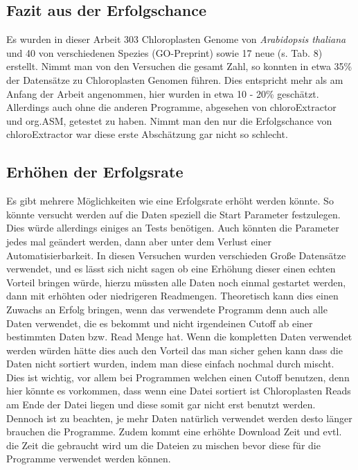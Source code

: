 \documentclass{scrartcl}
\begin{document}
\subsection{Fazit aus der Erfolgschance}
\label{sec-5-3}
Es wurden in dieser Arbeit 303 Chloroplasten Genome von \emph{Arabidopsis thaliana} und 40 von verschiedenen Spezies (GO-Preprint) sowie 17 neue (s. Tab. 8) erstellt. Nimmt man von den Versuchen die gesamt Zahl, so konnten in etwa 35\% der Datensätze zu Chloroplasten Genomen führen.
Dies entspricht mehr als am Anfang der Arbeit angenommen, hier wurden in etwa 10 - 20\% geschätzt\footnotemark[45]{}. Allerdings auch ohne die anderen Programme, abgesehen von chloroExtractor und org.ASM, getestet zu haben. Nimmt man 
den nur die Erfolgschance von chloroExtractor war diese erste Abschätzung gar nicht so schlecht.   
\subsection{Erhöhen der Erfolgsrate}
\label{sec-5-4}
Es gibt mehrere Möglichkeiten wie eine Erfolgsrate erhöht werden könnte. So könnte versucht werden auf die Daten speziell die Start Parameter festzulegen. Dies würde allerdings einiges an Tests benötigen. 
Auch könnten die Parameter jedes mal 
geändert werden, dann aber unter dem Verlust einer Automatisierbarkeit. In diesen Versuchen wurden verschieden Große Datensätze verwendet, und es lässt sich nicht sagen ob eine Erhöhung dieser einen echten Vorteil bringen würde, 
hierzu müssten alle Daten noch einmal gestartet werden, dann mit erhöhten oder niedrigeren Readmengen. Theoretisch kann dies einen Zuwachs an Erfolg bringen, wenn das verwendete Programm denn auch alle Daten verwendet, 
die es bekommt und nicht
irgendeinen Cutoff ab einer bestimmten Daten bzw. Read Menge hat. Wenn die kompletten Daten verwendet werden würden hätte dies auch den Vorteil das man sicher gehen kann dass die Daten nicht sortiert wurden, indem man diese
einfach nochmal durch mischt. Dies ist wichtig, vor allem bei Programmen welchen einen Cutoff benutzen, denn hier könnte es vorkommen, dass wenn eine Datei sortiert ist Chloroplasten Reads am Ende der Datei liegen und diese somit
gar nicht erst benutzt werden. Dennoch ist zu beachten, je mehr Daten natürlich verwendet werden desto länger brauchen die Programme. Zudem kommt eine erhöhte Download Zeit und evtl. die Zeit die gebraucht wird um die Dateien zu 
mischen bevor diese für die Programme verwendet werden können. 
\end{document}
